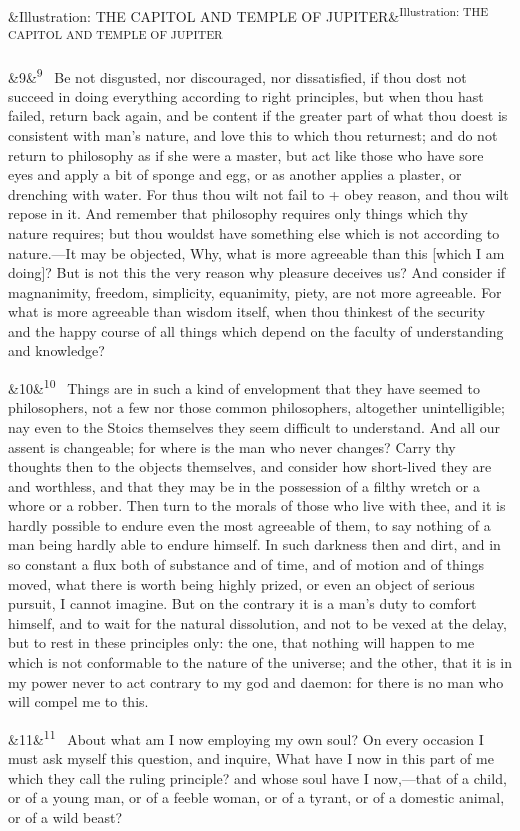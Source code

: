 \documentclass[12pt]{article}
\newcommand{\para}[1][]{\par\noindent\ifx&#1&\else\textsuperscript{\footnotesize #1}~\fi}
\begin{document}
\para [Illustration: THE CAPITOL AND TEMPLE OF JUPITER]

\para[9] Be not disgusted, nor discouraged, nor dissatisfied, if thou dost not
succeed in doing everything according to right principles, but when
thou hast failed, return back again, and be content if the greater part
of what thou doest is consistent with man's nature, and love this to
which thou returnest; and do not return to philosophy as if she were a
master, but act like those who have sore eyes and apply a bit of sponge
and egg, or as another applies a plaster, or drenching with water. For
thus thou wilt not fail to + obey reason, and thou wilt repose in it.
And remember that philosophy requires only things which thy nature
requires; but thou wouldst have something else which is not according to
nature.---It may be objected, Why, what is more agreeable than this
[which I am doing]? But is not this the very reason why pleasure
deceives us? And consider if magnanimity, freedom, simplicity,
equanimity, piety, are not more agreeable. For what is more agreeable
than wisdom itself, when thou thinkest of the security and the happy
course of all things which depend on the faculty of understanding and
knowledge?

\para[10] Things are in such a kind of envelopment that they have seemed to
philosophers, not a few nor those common philosophers, altogether
unintelligible; nay even to the Stoics themselves they seem difficult to
understand. And all our assent is changeable; for where is the man who
never changes? Carry thy thoughts then to the objects themselves, and
consider how short-lived they are and worthless, and that they may be in
the possession of a filthy wretch or a whore or a robber. Then turn to
the morals of those who live with thee, and it is hardly possible to
endure even the most agreeable of them, to say nothing of a man being
hardly able to endure himself. In such darkness then and dirt, and in so
constant a flux both of substance and of time, and of motion and of
things moved, what there is worth being highly prized, or even an object
of serious pursuit, I cannot imagine. But on the contrary it is a man's
duty to comfort himself, and to wait for the natural dissolution, and
not to be vexed at the delay, but to rest in these principles only: the
one, that nothing will happen to me which is not conformable to the
nature of the universe; and the other, that it is in my power never to
act contrary to my god and daemon: for there is no man who will compel
me to this.

\para[11] About what am I now employing my own soul? On every occasion I must
ask myself this question, and inquire, What have I now in this part of
me which they call the ruling principle? and whose soul have I
now,---that of a child, or of a young man, or of a feeble woman, or of a
tyrant, or of a domestic animal, or of a wild beast?
\end{document}
